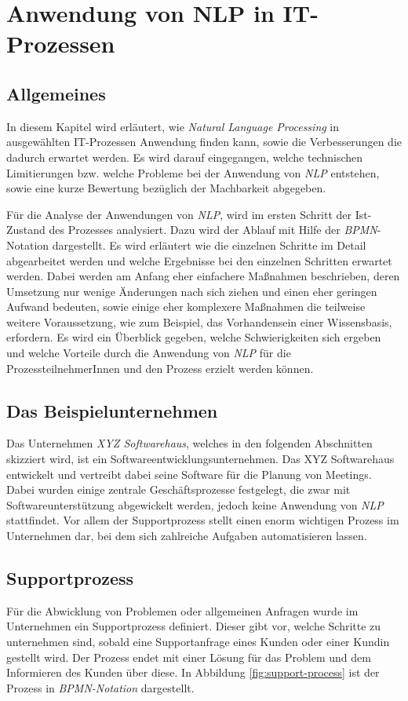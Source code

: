 \chapter{Anwendung von NLP in IT-Prozessen}
\label{cha:ApplicationsForNLPinProcesses}
\section{Allgemeines}

In diesem Kapitel wird erläutert, wie \textit{Natural Language Processing} in ausgewählten IT-Prozessen Anwendung finden kann, sowie die Verbesserungen die dadurch erwartet werden. Es wird darauf eingegangen, welche technischen Limitierungen bzw. welche Probleme bei der Anwendung von \textit{NLP} entstehen, sowie eine kurze Bewertung bezüglich der Machbarkeit abgegeben.

Für die Analyse der Anwendungen von \textit{NLP}, wird im ersten Schritt der Ist-Zustand des Prozesses analysiert. Dazu wird der Ablauf mit Hilfe der \textit{BPMN}-Notation dargestellt. Es wird erläutert wie die einzelnen Schritte im Detail abgearbeitet werden und welche Ergebnisse bei den einzelnen Schritten erwartet werden. Dabei werden am Anfang eher einfachere Maßnahmen beschrieben, deren Umsetzung nur wenige Änderungen nach sich ziehen und einen eher geringen Aufwand bedeuten, sowie einige eher komplexere Maßnahmen die teilweise weitere Voraussetzung, wie zum Beispiel, das Vorhandensein einer Wissensbasis, erfordern. Es wird ein Überblick gegeben, welche Schwierigkeiten sich ergeben und welche Vorteile durch die Anwendung von \textit{NLP} für die ProzessteilnehmerInnen und den Prozess erzielt werden können.

\section{Das Beispielunternehmen}
Das Unternehmen \textit{XYZ Softwarehaus}, welches in den folgenden Abschnitten skizziert wird, ist ein Softwareentwicklungsunternehmen. Das XYZ Softwarehaus entwickelt und vertreibt dabei seine Software für die Planung von Meetings. Dabei wurden einige zentrale Geschäftsprozesse festgelegt, die zwar mit Softwareunterstützung abgewickelt werden, jedoch keine Anwendung von \textit{NLP} stattfindet. Vor allem der Supportprozess stellt einen enorm wichtigen Prozess im Unternehmen dar, bei dem sich zahlreiche Aufgaben automatisieren lassen. 

\section{Supportprozess}
Für die Abwicklung von Problemen oder allgemeinen Anfragen wurde im Unternehmen ein Supportprozess definiert. Dieser gibt vor, welche Schritte zu unternehmen sind, sobald eine Supportanfrage eines Kunden oder einer Kundin gestellt wird. Der Prozess endet mit einer Lösung für das Problem und dem Informieren des Kunden über diese. In Abbildung \ref{fig:support-process} ist der Prozess in \textit{BPMN-Notation} dargestellt. 

